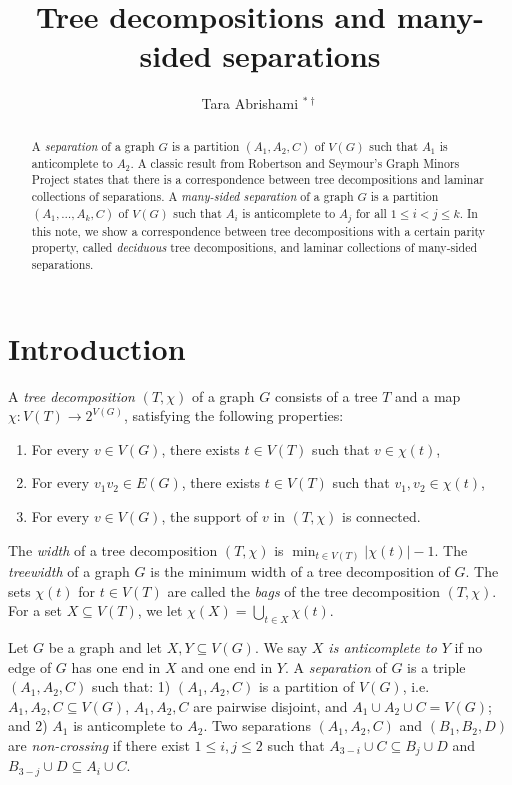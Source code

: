\documentclass[12pt]{amsart}
\title{Tree decompositions and many-sided separations}
\author{Tara Abrishami $^{\ast \dagger}$}
\begin{document}
\maketitle
\begin{abstract}
    A {\em separation} of a graph $G$ is a partition $(A_1, A_2, C)$ of $V(G)$ such that $A_1$ is anticomplete to $A_2$. A classic result from Robertson and Seymour's Graph Minors Project states that there is a correspondence between tree decompositions and laminar collections of separations. A {\em many-sided separation} of a graph $G$ is a partition $(A_1, \hdots, A_k, C)$ of $V(G)$ such that $A_i$ is anticomplete to $A_j$ for all $1 \leq i < j \leq k$. In this note, we show a correspondence between tree decompositions with a certain parity property, called {\em deciduous} tree decompositions, and laminar collections of many-sided separations.
\end{abstract}
\section{Introduction}

A {\em tree decomposition} $(T, \chi)$ of a graph $G$ consists of a tree $T$ and a map $\chi: V(T) \to 2^{V(G)}$, satisfying the following properties:
\begin{enumerate}[\hspace{1.5em} (i)]
    \item For every $v \in V(G)$, there exists $t \in V(T)$ such that $v \in \chi(t)$,
    \item For every $v_1v_2 \in E(G)$, there exists $t \in V(T)$ such that $v_1, v_2 \in \chi(t)$,
    \item For every $v \in V(G)$, the support of $v$ in $(T, \chi)$ is connected.
\end{enumerate}

The {\em width} of a tree decomposition $(T, \chi)$ is $\min_{t \in V(T)} |\chi(t)| - 1$. The {\em treewidth} of a graph $G$ is the minimum width of a tree decomposition of $G$. The sets $\chi(t)$ for $t \in V(T)$ are called the {\em bags} of the tree decomposition $(T, \chi)$. For a set $X \subseteq V(T)$, we let $\chi(X) = \bigcup_{t \in X} \chi(t)$.

Let $G$ be a graph and let $X, Y \subseteq V(G)$. We say {\em $X$ is anticomplete to $Y$} if no edge of $G$ has one end in $X$ and one end in $Y$. A {\em separation} of $G$ is a triple $(A_1, A_2, C)$ such that: 1) $(A_1, A_2, C)$ is a partition of $V(G)$, i.e. $A_1, A_2, C \subseteq V(G)$, $A_1, A_2, C$ are pairwise disjoint, and $A_1 \cup A_2 \cup C = V(G)$; and 2) $A_1$ is anticomplete to $A_2$. Two separations $(A_1, A_2, C)$ and $(B_1, B_2, D)$ are {\em non-crossing} if there exist $1 \leq i, j \leq 2$ such that $A_{3-i} \cup C \subseteq B_{j} \cup D$ and $B_{3-j} \cup D \subseteq A_i \cup C$.
\end{document}
